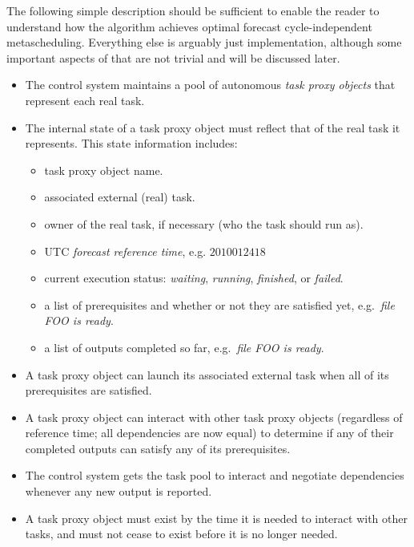 \documentclass[11pt,a4paper]{article}
\begin{document}
The following simple description should be sufficient to enable the
reader to understand how the algorithm achieves optimal forecast
cycle-independent metascheduling. Everything else is arguably just
implementation, although some important aspects of that are not trivial
and will be discussed later.

\begin{itemize}
    \item The control system maintains a pool of autonomous {\em task
        proxy objects} that represent each real task. 
       
    \item The internal state of a task proxy object must reflect that
        of the real task it represents. This state information includes:

        \begin{itemize}

            \item task proxy object name.

            \item associated external (real) task.  

            \item owner of the real task, if necessary (who the task
                should run as).

            \item UTC {\em forecast reference time}, e.g. $2010012418$
        
            \item current execution status: {\em waiting}, {\em running}, 
                {\em finished}, or {\em failed}. 

            \item a list of prerequisites and whether or not they are
                satisfied yet, e.g.\ {\em file FOO is ready}. 

            \item a list of outputs completed so far, e.g.\ {\em file
                FOO is ready}.

        \end{itemize}
       
    \item A task proxy object can launch its associated external task
        when all of its prerequisites are satisfied.

    \item A task proxy object can interact with other task proxy
        objects (regardless of reference time; all dependencies are now
        equal) to determine if any of their completed outputs can
        satisfy any of its prerequisites.

    \item The control system gets the task pool to interact and
        negotiate dependencies whenever any new output is reported.
 
    \item A task proxy object must exist by the time it is needed to
        interact with other tasks, and must not cease to exist before
        it is no longer needed.

\end{itemize}
\end{document}
